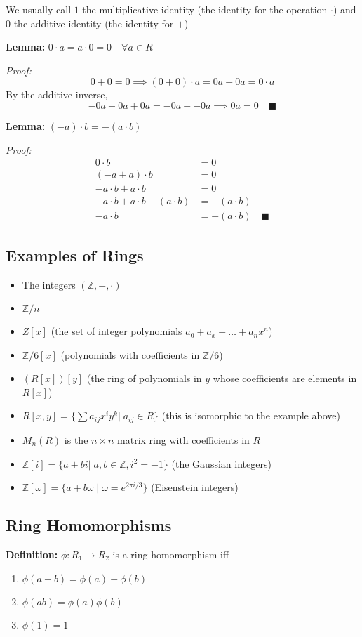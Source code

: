 \documentclass[12pt]{report}
\newcommand{\qed}{\quad \blacksquare}
\newcommand{\Z}{\mathbb{Z}}
\begin{document}
We usually call $1$ the multiplicative identity (the identity for the operation $\cdot$) and $0$ the additive identity (the identity for $+$)

\textbf{Lemma:} $0 \cdot a = a\cdot 0 = 0 \quad \forall a \in R$

\emph{Proof:} 
\[0 + 0 = 0 \implies (0 + 0)\cdot a = 0a + 0a = 0 \cdot a\]
By the additive inverse,
\[-0a + 0a + 0a = -0a + -0a \implies 0a = 0 \qed\]

\textbf{Lemma:} $(-a) \cdot b = -(a\cdot b)$

\emph{Proof:} 
\begin{align*}
    0 \cdot b &= 0\\
    (-a + a) \cdot b &= 0\\
    -a\cdot b + a\cdot b &= 0\\
    -a \cdot b + a\cdot b -(a\cdot b) &= -(a\cdot b)\\
    -a \cdot b &= -(a \cdot b) \qed
\end{align*}

\subsection*{Examples of Rings}
\begin{itemize}
    \item The integers $(\Z, + , \cdot)$
    \item $\Z/n$
    \item $Z[x]$ (the set of integer polynomials $a_0 + a_x + \dots + a_nx^n$)
    \item $\Z/6[x]$ (polynomials with coefficients in $\Z/6$)
    \item $(R[x])[y]$ (the ring of polynomials in $y$ whose coefficients are elements in $R[x]$)
    \item $R[x, y] = \{\sum a_{ij} x^i y^k | \; a_{ij} \in R\}$ (this is isomorphic to the example above)
    \item $M_n(R)$ is the $n \times n$ matrix ring with coefficients in $R$
    \item $\Z[i] = \{a + bi | \; a, b \in \Z, i^2 = -1\}$ (the Gaussian integers)
    \item $\Z[\omega] = \{a + b\omega\; | \; \omega = e^{2\pi i/3}\}$ (Eisenstein integers)
\end{itemize}

\subsection*{Ring Homomorphisms}
\textbf{Definition:} $\phi: R_1 \to R_2$ is a ring homomorphism iff 
\begin{enumerate}
    \item $\phi(a + b) = \phi(a) + \phi(b)$
    \item $\phi(ab) = \phi(a)\phi(b)$
    \item $\phi(1) = 1$
\end{enumerate}
\end{document}

